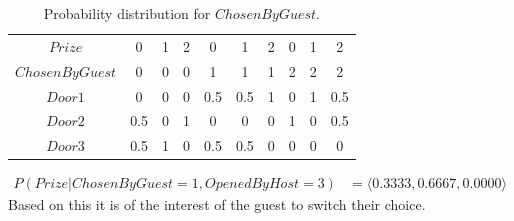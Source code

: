 \documentclass[10pt, a4paper, english]{../Template/NTNUoving}
\begin{document}
\begin{oppgave}
\begin{punkt}
        \begin{table}[h!]
            \centering
            \begin{tabular}{|c|c|c|c|c|c|c|c|c|c|}
                \hline
                $Prize$ & 0 & 1 & 2 & 0 & 1 & 2 & 0 & 1 & 2 \\ [1.0ex]
                $ChosenByGuest$ & 0 & 0 & 0 & 1 & 1 & 1 & 2& 2 & 2 \\ [1.0ex]
                \hline
                $Door1$ & 0 & 0 & 0 & 0.5 & 0.5 & 1 & 0 & 1  & 0.5 \\ [1.0ex]
                $Door2$ & 0.5 & 0 & 1 & 0 & 0 & 0 & 1 & 0 & 0.5 \\ [1.0ex]
                $Door3$ & 0.5 & 1 & 0 & 0.5 & 0.5 & 0 & 0 & 0 & 0 \\ [1.0ex]
                \hline
            \end{tabular}
            \caption{Probability distribution for $ChosenByGuest$.}
        \end{table}

        \begin{align*}
            P(Prize | ChosenByGuest = 1, OpenedByHost = 3) &= \langle 0.3333, 0.6667, 0.0000 \rangle
        \end{align*}
        Based on this it is of the interest of the guest to switch their choice.
    \end{punkt}
\end{oppgave}
\end{document}
